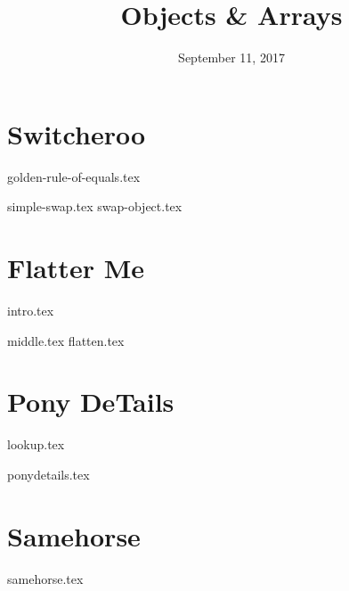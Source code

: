 \documentclass[11pt]{exam}
\title{Objects \& Arrays}
\date{September 11, 2017}
\begin{document}
\maketitle

\section{Switcheroo}
{golden-rule-of-equals.tex}
\begin{questions}
{simple-swap.tex}
{swap-object.tex}
\end{questions}

\newpage
\section{Flatter Me}
{intro.tex}
\begin{questions}
{middle.tex}
{flatten.tex}
\end{questions}

\section{Pony DeTails}
{lookup.tex}
\begin{questions}
{ponydetails.tex}
\end{questions}

\section{Samehorse\extra{}\midterm{}}
\begin{questions}
{samehorse.tex}
\end{questions}
\end{document}
